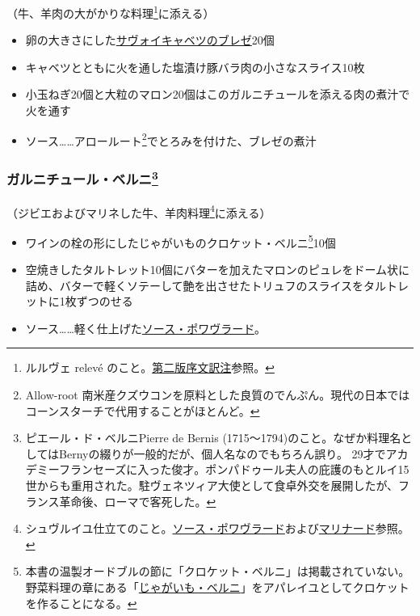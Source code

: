 \begin{recette}

（牛、羊肉の大がかりな料理\footnote{ルルヴェ relevé
  のこと。\protect\hyperlink{releve}{第二版序文訳注}参照。}に添える）

\begin{itemize}
\item
  卵の大きさにした\protect\hyperlink{chou-braise}{サヴォイキャベツのブレゼ}20個
\item
  キャベツとともに火を通した塩漬け豚バラ肉の小さなスライス10枚
\item
  小玉ねぎ20個と大粒のマロン20個はこのガルニチュールを添える肉の煮汁で火を通す
\item
  ソース\ldots{}\ldots{}アロールート\footnote{Allow-root
    南米産クズウコンを原料とした良質のでんぷん。現代の日本ではコーンスターチで代用することがほとんど。}でとろみを付けた、ブレゼの煮汁
\end{itemize}

\hypertarget{garniture-berny}{%
\subsubsection[ガルニチュール・ベルニ]{\texorpdfstring{ガルニチュール・ベルニ\footnote{ピエール・ド・ベルニPierre
  de Bernis
  (1715〜1794)のこと。なぜか料理名としてはBernyの綴りが一般的だが、個人名なのでもちろん誤り。
  29才でアカデミーフランセーズに入った俊才。ポンパドゥール夫人の庇護のもとルイ15世からも重用された。駐ヴェネツィア大使として食卓外交を展開したが、フランス革命後、ローマで客死した。}}{ガルニチュール・ベルニ}}\label{garniture-berny}}



（ジビエおよびマリネした牛、羊肉料理\footnote{シュヴルイユ仕立てのこと。\protect\hyperlink{sauce-porvrade}{ソース・ポワヴラード}および\protect\hyperlink{marinade-crue-pour-viandes-de-boucherie-ou-venaison}{マリナード}参照。}に添える）

\begin{itemize}
\item
  ワインの栓の形にしたじゃがいものクロケット・ベルニ\footnote{本書の温製オードブルの節に「クロケット・ベルニ」は掲載されていない。野菜料理の章にある「\protect\hyperlink{pommes-de-terre-berny}{じゃがいも・ベルニ}」をアパレイユとしてクロケットを作ることになる。}10個
\item
  空焼きしたタルトレット10個にバターを加えたマロンのピュレをドーム状に詰め、バターで軽くソテーして艶を出させたトリュフのスライスをタルトレットに1枚ずつのせる
\item
  ソース\ldots{}\ldots{}軽く仕上げた\protect\hyperlink{sauce-poivrade}{ソース・ポワヴラード}。
\end{itemize}


\end{recette}
